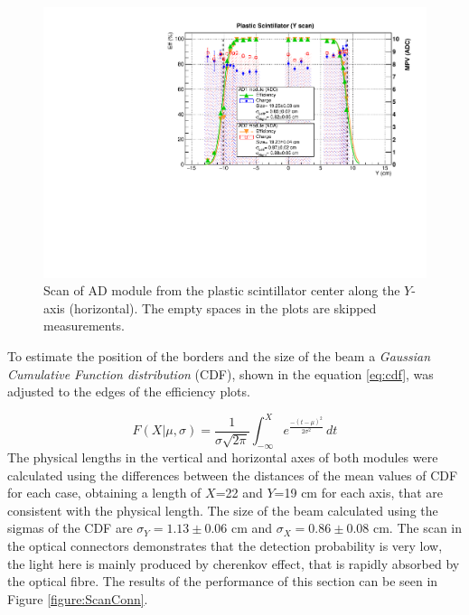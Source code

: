 	\begin{figure}[h!]
		\begin{center}
			\includegraphics[scale=0.5]{./images/scan/Yaxis_scan.pdf}
			\caption{Scan of AD module from the plastic scintillator center along the $Y$-axis (horizontal). 
				The empty spaces in the plots are skipped measurements.
				}
			\label{figure:ScanY-ADcenter}
		\end{center}
	\end{figure}
	To estimate the position of the borders and the size of the  beam a \textit{Gaussian Cumulative Function distribution} (CDF), shown in the 
	equation \ref{eq:cdf}, was adjusted to the edges of the efficiency plots.
	
	\begin{equation} \label{eq:cdf}
	F(X|\mu,\sigma)=\frac{1}{\sigma\sqrt{2\pi}} \displaystyle \int_{-\infty}^{X}
	e^{\frac{-(t-\mu)^{2}}{2\sigma^{2}}} \, dt
	\end{equation}
	The physical lengths in the vertical and horizontal axes of both modules were calculated using the differences between the distances of the mean values of CDF for each case, obtaining a length of $X$=22 and $Y$=19 cm for each axis, that are consistent with the physical length.
	The size of the beam calculated using the sigmas of the CDF are $\sigma_{Y}=1.13\pm 0.06$ cm and $\sigma_{X}=0.86\pm0.08$ cm. %
	The scan in the optical connectors demonstrates that the detection probability is very low, the light here is mainly produced by cherenkov effect, that is rapidly absorbed by the optical fibre. %
	The results of the performance of this section can be seen in Figure \ref{figure:ScanConn}.
	
